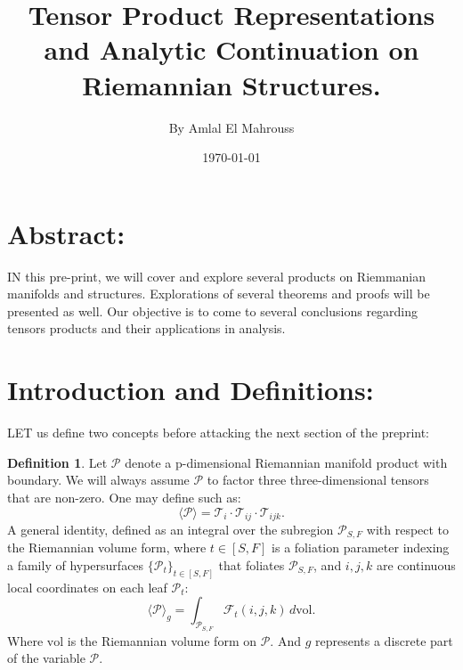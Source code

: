 \documentclass[10pt]{article}
\title{%
	\vspace{-1.5em}%
	\large\textbf{Tensor Product Representations and Analytic Continuation on Riemannian Structures.}%
}
\author{By Amlal El Mahrouss}
\date{\today}
\theoremstyle{plain}
\theoremstyle{definition}
\newtheorem{definition}[theorem]{Definition}
\theoremstyle{remark}
\begin{document}

\maketitle
\tableofcontents
\newpage

\section{Abstract:}

\lettrine[lines=1, lhang=0.1, loversize=0.2]{I}N this pre-print, we will cover and explore several products on Riemmanian manifolds and structures. Explorations of several theorems and proofs will be presented as well. Our objective is to come to several conclusions regarding tensors products and their applications in analysis.

\section{Introduction and Definitions:}

\lettrine[lines=1, lhang=0.1, loversize=0.2]{L}ET us define two concepts before attacking the next section of the preprint:

\begin{definition}
\label{def:two-one}
    Let $\mathcal{P}$ denote a p-dimensional Riemannian manifold product with boundary. We will always assume $\mathcal{P}$ to factor three three-dimensional tensors that are non-zero. One may define such as:
    \begin{equation}
      \langle \mathcal{P} \rangle = \mathcal{T}_i \cdot \mathcal{T}_{ij} \cdot \mathcal{T}_{ijk}.
    \end{equation}
    A general identity, defined as an integral over the subregion $\mathcal{P}_{S,F}$ with respect to the Riemannian volume form, where $t \in [S, F]$ is a foliation parameter indexing a family of hypersurfaces $\{\mathcal{P}_t\}_{t \in [S,F]}$ that foliates $\mathcal{P}_{S,F}$, and $i, j, k$ are continuous local coordinates on each leaf $\mathcal{P}_t$:
    \begin{equation}
      \langle \mathcal{P} \rangle_{g} = \int_{\mathcal{P}_{S,F}} \mathcal{F}_{t}(i, j, k) \, d\mathrm{vol}.
    \end{equation}
    Where $\mathrm{vol}$ is the Riemannian volume form on $\mathcal{P}$. And $g$ represents a discrete part of the variable $\mathcal{P}$. 
\end{definition}
\end{document}
